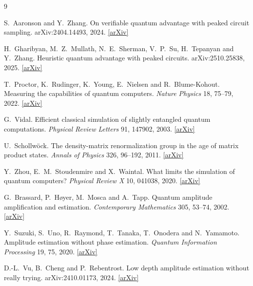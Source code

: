 \documentclass[11pt,a4paper]{article}
\begin{document}
\begin{thebibliography}{9}
\small
\setlength{\itemsep}{0pt}

S.~Aaronson and Y.~Zhang.
On verifiable quantum advantage with peaked circuit sampling.
arXiv:2404.14493, 2024.
\href{https://arxiv.org/abs/2404.14493}{[arXiv]}

H.~Gharibyan, M.~Z.~Mullath, N.~E.~Sherman, V.~P.~Su,
H.~Tepanyan and Y.~Zhang.
Heuristic quantum advantage with peaked circuits.
arXiv:2510.25838, 2025.
\href{https://arxiv.org/abs/2510.25838}{[arXiv]}

T.~Proctor, K.~Rudinger, K.~Young, E.~Nielsen
and R.~Blume-Kohout.
Measuring the capabilities of quantum computers.
\emph{Nature Physics} 18, 75--79, 2022.
\href{https://arxiv.org/abs/2008.11294}{[arXiv]}

G.~Vidal.
Efficient classical simulation of slightly entangled
quantum computations.
\emph{Physical Review Letters} 91, 147902, 2003.
\href{https://arxiv.org/abs/quant-ph/0301063}{[arXiv]}

U.~Schollw\"ock.
The density-matrix renormalization group in the
age of matrix product states.
\emph{Annals of Physics} 326, 96--192, 2011.
\href{https://arxiv.org/abs/1008.3477}{[arXiv]}

Y.~Zhou, E.~M.~Stoudenmire and X.~Waintal.
What limits the simulation of quantum computers?
\emph{Physical Review X} 10, 041038, 2020.
\href{https://arxiv.org/abs/2002.07730}{[arXiv]}

G.~Brassard, P.~H\o yer, M.~Mosca and A.~Tapp.
Quantum amplitude amplification and estimation.
\emph{Contemporary Mathematics} 305, 53--74, 2002.
\href{https://arxiv.org/abs/quant-ph/0005055}{[arXiv]}

Y.~Suzuki, S.~Uno, R.~Raymond, T.~Tanaka,
T.~Onodera and N.~Yamamoto.
Amplitude estimation without phase estimation.
\emph{Quantum Information Processing} 19, 75, 2020.
\href{https://arxiv.org/abs/1904.10246}{[arXiv]}

D.-L.~Vu, B.~Cheng and P.~Rebentrost.
Low depth amplitude estimation without really trying.
arXiv:2410.01173, 2024.
\href{https://arxiv.org/abs/2410.01173}{[arXiv]}

\end{thebibliography}
\end{document}
